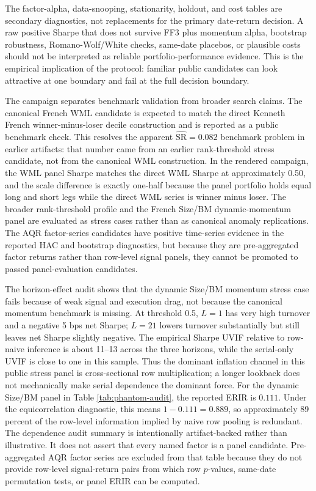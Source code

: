 \documentclass[12pt,a4paper]{article}
\newcommand{\SR}{\mathrm{SR}}
\begin{document}
The factor-alpha, data-snooping, stationarity, holdout, and cost tables
are secondary diagnostics, not replacements for the primary date-return
decision.  A raw positive Sharpe that does not survive FF3 plus momentum
alpha, bootstrap robustness, Romano-Wolf/White checks, same-date
placebos, or plausible costs should not be interpreted as reliable
portfolio-performance evidence.  This is the empirical implication of
the protocol: familiar
public candidates can look attractive at one boundary and fail at the
full decision boundary.



The campaign separates benchmark validation from broader search
claims.  The canonical French WML candidate is expected to match the
direct Kenneth French winner-minus-loser decile construction and is
reported as a public benchmark check.  This resolves the apparent
\(\widehat{\SR}=0.082\) benchmark problem in earlier artifacts: that
number came from an earlier rank-threshold stress candidate, not from the
canonical WML construction.  In the rendered campaign, the WML panel
Sharpe matches the direct WML Sharpe at approximately 0.50, and the
scale difference is exactly one-half because the panel portfolio holds
equal long and short legs while the direct WML series is winner minus
loser.  The broader rank-threshold profile and the French Size/BM
dynamic-momentum panel are evaluated as stress cases rather than as
canonical anomaly replications.  The AQR
factor-series candidates have positive time-series evidence in the
reported HAC and bootstrap diagnostics, but because they are
pre-aggregated factor returns rather than row-level signal panels, they
cannot be promoted to passed panel-evaluation candidates.

The horizon-effect audit shows that the dynamic Size/BM momentum stress
case fails because of weak signal and execution drag, not because the
canonical momentum benchmark is missing.  At threshold 0.5, \(L=1\)
has very high turnover and a negative 5 bps net Sharpe; \(L=21\) lowers
turnover substantially but still leaves net Sharpe slightly negative.
The empirical Sharpe UVIF relative to row-naive inference is about
11--13 across the three horizons, while the serial-only UVIF is close to
one in this sample.  Thus the dominant inflation channel in this public
stress panel is cross-sectional row multiplication; a longer lookback
does not mechanically make serial dependence the dominant force.
For the dynamic Size/BM panel in Table \ref{tab:phantom-audit}, the
reported ERIR is \(0.111\).  Under the equicorrelation diagnostic, this
means \(1-0.111=0.889\), so approximately 89 percent of the row-level
information implied by naive row pooling is redundant.
The dependence audit summary is intentionally artifact-backed rather than
illustrative.  It does not assert that every named factor is a panel
candidate.  Pre-aggregated AQR factor series are excluded from that
table because they do not provide row-level signal-return pairs from
which row \(p\)-values, same-date permutation tests, or panel ERIR can be
computed.
\end{document}
